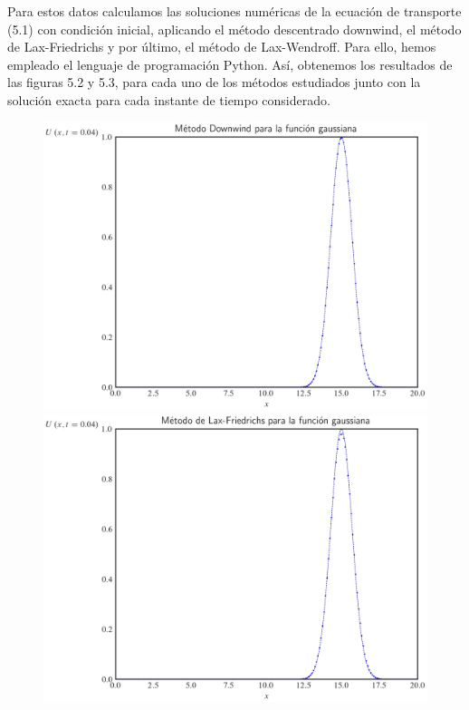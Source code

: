 Para estos datos calculamos las soluciones numéricas de la ecuación
de transporte (5.1) con condición inicial, aplicando el método
descentrado downwind, el método de Lax-Friedrichs y por último, el
método de Lax-Wendroff.
Para ello, hemos empleado el lenguaje de programación Python.
Así, obtenemos los resultados de las figuras 5.2 y 5.3, para cada uno
de los métodos estudiados junto con la solución exacta para cada
instante de tiempo considerado.

\begin{figure}[ht!]
    \centering
    \includegraphics[width=.35\paperwidth]{../snapshots/downwindgaussian1d-2.png}
    \includegraphics[width=.35\paperwidth]{../snapshots/lax-friedrichsgaussiana1d-2.png}

\end{figure}

